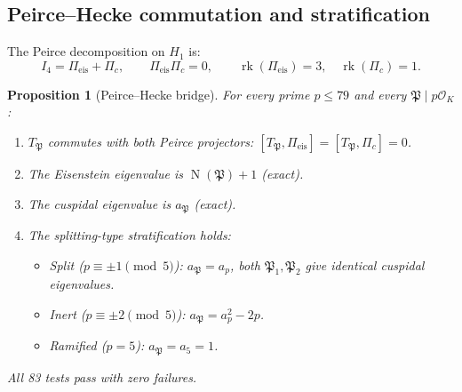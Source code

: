 \documentclass[11pt,a4paper]{article}
\theoremstyle{plain}
\newtheorem{proposition}[theorem]{Proposition}
\theoremstyle{definition}
\theoremstyle{remark}
\numberwithin{equation}{section}
\providecommand{\cO}{\mathcal{O}}
\providecommand{\fP}{\mathfrak{P}}
\DeclareMathOperator{\Nm}{N}
\DeclareMathOperator{\rk}{rk}
\begin{document}
\subsection{Peirce--Hecke commutation and stratification}

The Peirce decomposition on $H_1$ is:
\[
  I_4 = \Pi_{\mathrm{eis}} + \Pi_c, \qquad
  \Pi_{\mathrm{eis}}\Pi_c = 0, \qquad
  \rk(\Pi_{\mathrm{eis}}) = 3, \quad \rk(\Pi_c) = 1.
\]

\begin{proposition}[Peirce--Hecke bridge]\label{prop:bridge}
For every prime $p \leq 79$ and every $\fP \mid p\cO_K$:
\begin{enumerate}[label=(\roman*)]
\item $T_\fP$ commutes with both Peirce projectors: $[T_\fP, \Pi_{\mathrm{eis}}] = [T_\fP, \Pi_c] = 0$.
\item The Eisenstein eigenvalue is $\Nm(\fP)+1$ (exact).
\item The cuspidal eigenvalue is $a_\fP$ (exact).
\item The splitting-type stratification holds:
  \begin{itemize}
  \item Split ($p \equiv \pm 1 \pmod{5}$): $a_\fP = a_p$, both $\fP_1, \fP_2$
    give identical cuspidal eigenvalues.
  \item Inert ($p \equiv \pm 2 \pmod{5}$): $a_\fP = a_p^2 - 2p$.
  \item Ramified ($p = 5$): $a_\fP = a_5 = 1$.
  \end{itemize}
\end{enumerate}
All 83 tests pass with zero failures.
\end{proposition}
\end{document}
